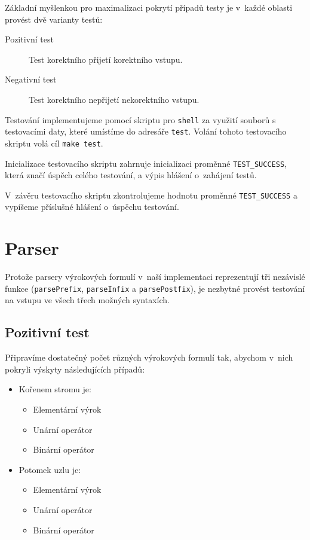 \documentclass[thesis=B,czech,hidelinks]{FITthesis}[2012/06/26]
\begin{document}
Základní myšlenkou pro maximalizaci pokrytí případů testy je v~každé oblasti provést dvě varianty testů:

\begin{description}
	\item[Pozitivní test] Test korektního přijetí korektního vstupu.
	\item[Negativní test] Test korektního nepřijetí nekorektního vstupu.
\end{description}

Testování implementujeme pomocí skriptu pro \texttt{shell} za využití souborů s testovacími daty, které umístíme do adresáře \texttt{test}. Volání tohoto testovacího skriptu volá cíl \texttt{make test}.

Inicializace testovacího skriptu zahrnuje inicializaci proměnné \texttt{TEST\_SUCCESS}, která značí úspěch celého testování, a výpis hlášení o~zahájení testů.



V~závěru testovacího skriptu zkontrolujeme hodnotu proměnné \texttt{TEST\_SUCCESS} a vypíšeme příslušné hlášení o~úspěchu testování.



\section{Parser}

Protože parsery výrokových formulí v~naší implementaci reprezentují tři nezávislé funkce (\texttt{parsePrefix}, \texttt{parseInfix} a \texttt{parsePostfix}), je nezbytné provést testování na vstupu ve všech třech možných syntaxích. 

\subsection{Pozitivní test}

Připravíme dostatečný počet různých výrokových formulí tak, abychom v~nich pokryli výskyty následujících případů:

\begin{itemize}
	\item Kořenem stromu je:
	\begin{itemize}
		\item Elementární výrok
		\item Unární operátor
		\item Binární operátor
	\end{itemize}
	\item Potomek uzlu je:
	\begin{itemize}
		\item Elementární výrok
		\item Unární operátor
		\item Binární operátor
	\end{itemize}
\end{itemize}
\end{document}
